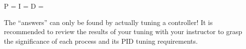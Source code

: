 \vskip 10pt

P = \underbar{\hskip 50pt} \hskip 50pt I = \underbar{\hskip 50pt} \hskip 50pt D = \underbar{\hskip 50pt}

\vskip 10pt







The ``answers'' can only be found by actually tuning a controller!  It is recommended to review the results of your tuning with your instructor to grasp the significance of each process and its PID tuning requirements.











